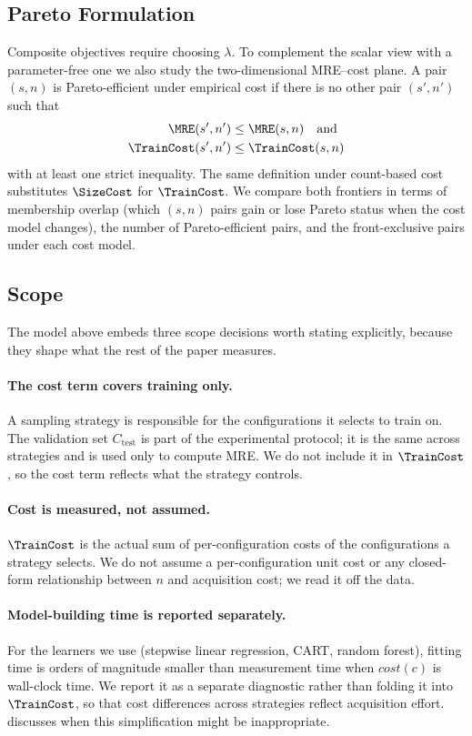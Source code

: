 \subsection{Pareto Formulation}
\label{subsec:pareto}

Composite objectives require choosing $\lambda$. To complement the scalar
view with a parameter-free one we also study the two-dimensional MRE--cost
plane. A pair $(s,n)$ is Pareto-efficient under empirical cost if there is
no other pair $(s',n')$ such that
\begin{align*}
\MRE(s',n') &\le \MRE(s,n) \quad\text{and}\\
\TrainCost(s',n') &\le \TrainCost(s,n)
\end{align*}
with at least one strict inequality. The same definition under count-based
cost substitutes $\SizeCost$ for $\TrainCost$. We compare both frontiers in
terms of membership overlap (which $(s,n)$ pairs gain or lose Pareto status
when the cost model changes), the number of Pareto-efficient pairs, and the
front-exclusive pairs under each cost model.

\subsection{Scope}
\label{subsec:scope}

The model above embeds three scope decisions worth stating explicitly,
because they shape what the rest of the paper measures.

\paragraph*{The cost term covers training only.}
A sampling strategy is responsible for the configurations it selects to
train on. The validation set $C_{\text{test}}$ is part of the experimental
protocol; it is the same across strategies and is used only to compute MRE.
We do not include it in $\TrainCost$, so the cost term reflects what the
strategy controls.

\paragraph*{Cost is measured, not assumed.}
$\TrainCost$ is the actual sum of per-configuration costs of the
configurations a strategy selects. We do not assume a per-configuration
unit cost or any closed-form relationship between $n$ and acquisition
cost; we read it off the data.

\paragraph*{Model-building time is reported separately.}
For the learners we use (stepwise linear regression, CART, random forest),
fitting time is orders of magnitude smaller than measurement time when
$\mathit{cost}(c)$ is wall-clock time. We
report it as a separate diagnostic rather than folding it into
$\TrainCost$, so that cost differences across strategies reflect
acquisition effort.  discusses when this simplification
might be inappropriate.
